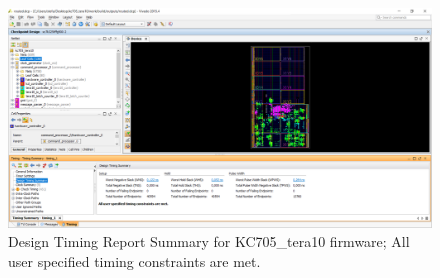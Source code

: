 \begin{figure}[H]
	\centering
	\includegraphics[width=0.95\linewidth]{IMG/ch4/TIMING_perfect}
	\caption{Design Timing Report Summary for KC705\_tera10 firmware; All user specified timing constraints are met.}
	\label{fig:timingperfect}
\end{figure}

